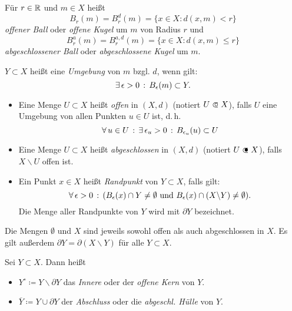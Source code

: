 \documentclass{cheat-sheet}
\begin{document}

\begin{defn}
  Für $r \in \mathbb{R}$ und $m \in X$ heißt
  \[ B_r(m) = B_r^d(m) = \{ x \in X : d(x, m) < r \} \]
  \emph{offener Ball} oder \emph{offene Kugel} um $m$ von Radius $r$ und
  \[ B_r^a(m) = B_r^{a,d}(m) = \{ x \in X : d(x, m) \le r \} \]
  \emph{abgeschlossener Ball} oder \emph{abgeschlossene Kugel} um $m$.
\end{defn}

\begin{defn}
  $Y \subset X$ heißt eine \emph{Umgebung} von $m$ bzgl. $d$, wenn gilt:
  \[ \exists \, {\epsilon > 0} \,:\, B_{\epsilon}(m) \subset Y. \]
\end{defn}

\begin{defn}
\begin{itemize}
  \item Eine Menge $U \subset X$ heißt \emph{offen} in $(X, d)$ (notiert $U \opn X$), falls $U$ eine Umgebung von allen Punkten $u \in U$ ist, d.\,h.
  \[ \forall \, {u \in U} \,:\, \exists \, {\epsilon_u > 0} \,:\, B_{\epsilon_u}(u) \subset U \]
  \item Eine Menge $U \subset X$ heißt \emph{abgeschlossen} in $(X, d)$ (notiert $U \cls X$), falls $X \backslash U$ offen ist.
  \item Ein Punkt $x \in X$ heißt \emph{Randpunkt} von $Y \subset X$, falls gilt:
  \[ \forall \, {\epsilon > 0} \,:\, ( B_{\epsilon}(x) \cap Y \not= \emptyset \text{ und } B_{\epsilon}(x) \cap (X \backslash Y) \not= \emptyset). \]
  Die Menge aller Randpunkte von $Y$ wird mit \emph{$\partial Y$} bezeichnet.
\end{itemize}
\end{defn}

\begin{bem}
Die Mengen $\emptyset$ und $X$ sind jeweils sowohl offen als auch abgeschlossen in $X$. Es gilt außerdem $\partial Y = \partial (X \backslash Y)$ für alle $Y \subset X$.
\end{bem}

\begin{defn}
Sei $Y \subset X$. Dann heißt
\begin{itemize}
  \item $Y^{\circ} \coloneqq Y \backslash \partial Y$ das \emph{Innere} oder der \emph{offene Kern} von $Y$.
  \item $\overline{Y} \coloneqq Y \cup \partial Y$ der \emph{Abschluss} oder die \emph{abgeschl. Hülle} von $Y$.
\end{itemize}
\end{defn}
\end{document}
